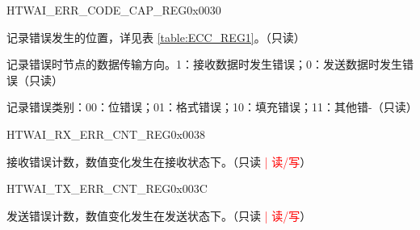 \begin{register}{H}{TWAI\_ERR\_CODE\_CAP\_REG}{0x0030}\label{regdesc:TWAIERRCODECAPREG}
%
%
%
%
\regnewline%
\begin{regdesc}\begin{reglist}
\label{fielddesc:TWAIECCSEGMENT}\item [TWAI\_ECC\_SEGMENT] 记录错误发生的位置，详见表 \ref{table:ECC_REG1}。（只读）
\label{fielddesc:TWAIECCDIRECTION}\item [TWAI\_ECC\_DIRECTION] 记录错误时节点的数据传输方向。1：接收数据时发生错误；0：发送数据时发生错误（只读）
\label{fielddesc:TWAIECCTYPE}\item [TWAI\_ECC\_TYPE] 记录错误类别：00：位错误；01：格式错误；10：填充错误；11：其他错-（只读）
\end{reglist}\end{regdesc}
\end{register}


\begin{register}{H}{TWAI\_RX\_ERR\_CNT\_REG}{0x0038}\label{regdesc:TWAIRXERRCNTREG}
%
%
\regnewline%
\begin{regdesc}\begin{reglist}
\label{fielddesc:TWAIRXERRCNT}\item [TWAI\_RX\_ERR\_CNT] 接收错误计数，数值变化发生在接收状态下。（只读 \textcolor{red}{| 读/写}）
\end{reglist}\end{regdesc}
\end{register}


\begin{register}{H}{TWAI\_TX\_ERR\_CNT\_REG}{0x003C}\label{regdesc:TWAITXERRCNTREG}
%
%
\regnewline%
\begin{regdesc}\begin{reglist}
\label{fielddesc:TWAITXERRCNT}\item [TWAI\_TX\_ERR\_CNT] 发送错误计数，数值变化发生在发送状态下。（只读 \textcolor{red}{| 读/写}）
\end{reglist}\end{regdesc}
\end{register}


